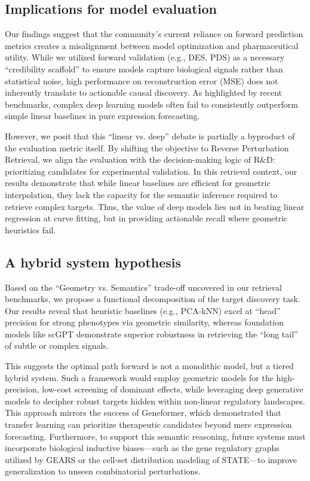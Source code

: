\documentclass{article}
\begin{document}
\subsection{Implications for model evaluation}
Our findings suggest that the community’s current reliance on forward prediction metrics creates a misalignment between model optimization and pharmaceutical utility. While we utilized forward validation (e.g., DES, PDS) as a necessary ``credibility scaffold'' to ensure models capture biological signals rather than statistical noise, high performance on reconstruction error (MSE) does not inherently translate to actionable causal discovery. As highlighted by recent benchmarks, complex deep learning models often fail to consistently outperform simple linear baselines in pure expression forecasting.

However, we posit that this ``linear vs. deep'' debate is partially a byproduct of the evaluation metric itself. By shifting the objective to Reverse Perturbation Retrieval, we align the evaluation with the decision-making logic of R\&D: prioritizing candidates for experimental validation. In this retrieval context, our results demonstrate that while linear baselines are efficient for geometric interpolation, they lack the capacity for the semantic inference required to retrieve complex targets. Thus, the value of deep models lies not in beating linear regression at curve fitting, but in providing actionable recall where geometric heuristics fail.

\subsection{A hybrid system hypothesis}
Based on the ``Geometry vs. Semantics'' trade-off uncovered in our retrieval benchmarks, we propose a functional decomposition of the target discovery task. Our results reveal that heuristic baselines (e.g., PCA-kNN) excel at ``head'' precision for strong phenotypes via geometric similarity, whereas foundation models like scGPT demonstrate superior robustness in retrieving the ``long tail'' of subtle or complex signals.

This suggests the optimal path forward is not a monolithic model, but a tiered hybrid system. Such a framework would employ geometric models for the high-precision, low-cost screening of dominant effects, while leveraging deep generative models to decipher robust targets hidden within non-linear regulatory landscapes. This approach mirrors the success of Geneformer, which demonstrated that transfer learning can prioritize therapeutic candidates beyond mere expression forecasting. Furthermore, to support this semantic reasoning, future systems must incorporate biological inductive biases—such as the gene regulatory graphs utilized by GEARS or the cell-set distribution modeling of STATE—to improve generalization to unseen combinatorial perturbations.
\end{document}
